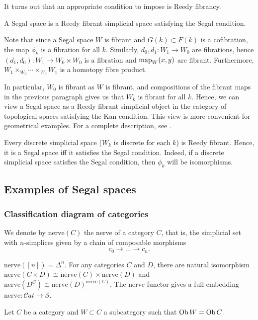 \begin{refsection}
It turns out that an appropriate condition to impose is Reedy fibrancy.
\begin{defin}
A Segal space is a Reedy fibrant simplicial space satisfying the Segal condition.
\end{defin}
Note that since a Segal space $W$ is fibrant and $G(k)\subset F(k)$ is a cofibration, the map $\phi_k$ is a fibration for all $k$. Similarly, $d_0,d_1:W_1\to W_0$ are fibrations, hence $(d_1,d_0):W_1\to W_0\times W_0$ is a fibration and $\operatorname{\mathrm{map}}_W(x,y)$ are fibrant. Furthermore, $W_1\times_{W_0}\cdots\times_{W_0}W_1$ is a homotopy fibre product.

In particular, $W_0$ is fibrant as $W$ is fibrant, and compositions of the fibrant maps in the previous paragraph gives us that $W_k$ is fibrant for all $k$. Hence, we can view a Segal space as a Reedy fibrant simplicial object in the category of topological spaces satisfying the Kan condition. This view is more convenient for geometrical examples. For a complete description, see \cite{lurietft}.

\begin{eg}
Every discrete simplicial space ($W_k$ is discrete for each $k$) is Reedy fibrant. Hence, it is a Segal space iff it satisfies the Segal condition. Indeed, if a discrete simplicial space satisfies the Segal condition, then $\phi_k$ will be isomorphisms.
\end{eg}

\subsection{Examples of Segal spaces}\label{egss}
\subsubsection{Classification diagram of categories}
We denote by $\mathrm{nerve}(C)$ the nerve of a category $C$, that is, the simplicial set with $n$-simplices given by a chain of composable morphisms
$$c_0\to\ldots\to c_n.$$
\begin{prop}\label{nerve}
  $\mathrm{nerve}([n])=\Delta^n$. For any categories $C$ and $D$, there are natural isomorphism $\mathrm{nerve}(C\times D)\cong\mathrm{nerve}(C)\times\mathrm{nerve}(D)$ and $\mathrm{nerve}(D^C)\cong\mathrm{nerve}(D)^{\mathrm{nerve}(C)}$. The nerve functor gives a full embedding $\mathrm{nerve}:{\mathcal{C}}at\to\mathcal S$.
\end{prop}

Let $C$ be a category and $W\subset C$ a subcategory such that $\operatorname{Ob} W=\operatorname{Ob} C$. 


\end{refsection}
